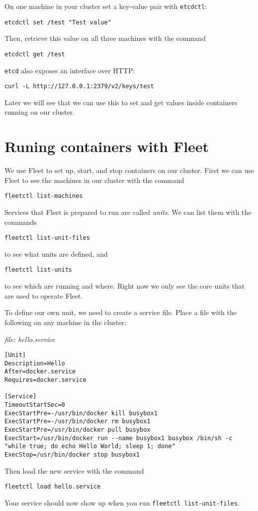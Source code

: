 \documentclass{article}
\begin{document}
On one machine in your cluster set a key-value pair with \texttt{etcdctl}:

\texttt{etcdctl set /test "Test value"}

Then, retrieve this value on all three machines with the command

\texttt{etcdctl get /test}

\texttt{etcd} also exposes an interface over HTTP:

\texttt{curl -L http://127.0.0.1:2379/v2/keys/test}

Later we will see that we can use this to set and get values inside containers running on our cluster.

\section{Runing containers with Fleet}
We use Fleet to set up, start, and stop containers on our cluster.  First we can use Fleet to see the machines in our cluster with the command

\texttt{fleetctl list-machines}

Services that Fleet is prepared to run are called \emph{units}.  We can list them with the commands

\texttt{fleetctl list-unit-files}

to see what units are defined, and

\texttt{fleetctl list-units} 

to see which are running and where.  Right now we only see the core units that are used to operate Fleet.

To define our own unit, we need to create a service file. Place a file with the following on any machine in the cluster:

\emph{file:  hello.service}
\begin{verbatim}
[Unit]
Description=Hello
After=docker.service
Requires=docker.service

[Service]
TimeoutStartSec=0
ExecStartPre=-/usr/bin/docker kill busybox1
ExecStartPre=-/usr/bin/docker rm busybox1
ExecStartPre=/usr/bin/docker pull busybox
ExecStart=/usr/bin/docker run --name busybox1 busybox /bin/sh -c "while true; do echo Hello World; sleep 1; done"
ExecStop=/usr/bin/docker stop busybox1
\end{verbatim}

Then load the new service with the command

\texttt{fleetctl load hello.service}

Your service should now show up when you run \texttt{fleetctl list-unit-files}.
\end{document}
